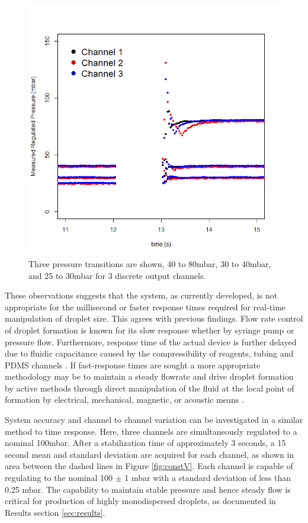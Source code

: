 \begin{figure}[H]
\centering 
\includegraphics[width=01.0\columnwidth]{timeResponse.PNG} 
\caption[PDFC time response]{Three pressure transitions are shown, 40 to 80mbar, 30 to 40mbar, and 25 to 30mbar for 3 discrete output channels. } 
\label{fig:timeResponse} 
\end{figure}

These observations suggests that the system, as currently developed, is not appropriate for the millisecond or faster response times required for real-time manipulation of droplet size. This agrees with previous findings. Flow rate control of droplet formation is known for its slow response whether by syringe pump or pressure flow. Furthermore, response time of the actual device is further delayed due to fluidic capacitance caused by the compressibility of reagents, tubing and PDMS channels \cite{Churski2013,Stone2004}. If fast-response times are sought a more appropriate methodology may be to maintain a steady flowrate and drive droplet formation by active methods through direct manipulation of the fluid at the local point of formation by electrical, mechanical, magnetic, or acoustic means \cite{Chong2016}.


System accuracy and channel to channel variation can be investigated in a similar method to time response. Here, three channels are simultaneously regulated to a nominal 100mbar. After a stabilization time of approximately 3 seconds, a 15 second mean and standard deviation are acquired for each channel, as shown in area between the dashed lines in Figure \vref{fig:constV}. Each channel is capable of regulating to the nominal 100 $\pm$ 1 mbar with a standard deviation of less than 0.25 mbar. The capability to maintain stable pressure and hence steady flow is critical for production of highly monodispersed droplets, as documented in Results section \ref{sec:results}.


